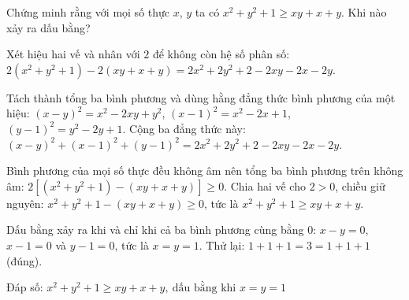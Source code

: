 \begin{problem}[9DS-BPT-045]
Chứng minh rằng với mọi số thực $x$, $y$ ta có $x^2 + y^2 + 1 \geq xy + x + y$. Khi nào xảy ra dấu bằng?

\begin{solution}
Xét hiệu hai vế và nhân với $2$ để không còn hệ số phân số: $2(x^2 + y^2 + 1) - 2(xy + x + y) = 2x^2 + 2y^2 + 2 - 2xy - 2x - 2y$.

Tách thành tổng ba bình phương và dùng hằng đẳng thức bình phương của một hiệu: $(x - y)^2 = x^2 - 2xy + y^2$, $(x - 1)^2 = x^2 - 2x + 1$, $(y - 1)^2 = y^2 - 2y + 1$. Cộng ba đẳng thức này: $(x - y)^2 + (x - 1)^2 + (y - 1)^2 = 2x^2 + 2y^2 + 2 - 2xy - 2x - 2y$.

Bình phương của mọi số thực đều không âm nên tổng ba bình phương trên không âm: $2\left[(x^2 + y^2 + 1) - (xy + x + y)\right] \geq 0$. Chia hai vế cho $2 > 0$, chiều giữ nguyên: $x^2 + y^2 + 1 - (xy + x + y) \geq 0$, tức là $x^2 + y^2 + 1 \geq xy + x + y$.

Dấu bằng xảy ra khi và chỉ khi cả ba bình phương cùng bằng $0$: $x - y = 0$, $x - 1 = 0$ và $y - 1 = 0$, tức là $x = y = 1$. Thử lại: $1 + 1 + 1 = 3 = 1 + 1 + 1$ (đúng).

Đáp số: $\boxed{x^2 + y^2 + 1 \geq xy + x + y,\ \text{dấu bằng khi } x = y = 1}$
\end{solution}
\end{problem}

